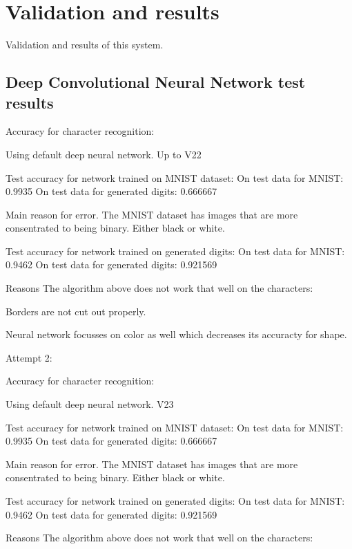 \chapter{Validation and results}
\label{ap:results}
\graphicspath{{Appendix5/Appendix5figures/}}

Validation and results of this system.

\section{Deep Convolutional Neural Network test results}
\label{sec:DCNNresult}

Accuracy for character recognition:

Using default deep neural network. Up to V22

Test accuracy for network trained on MNIST dataset:
On test data for MNIST: 		0.9935
On test data for generated digits: 	0.666667

Main reason for error.
The MNIST dataset has images that are more consentrated to being binary.
Either black or white.

Test accuracy for network trained on generated digits:
On test data for MNIST:			 0.9462
On test data for generated digits:	 0.921569


Reasons The algorithm above does not work that well on the characters:


Borders are not cut out properly.

Neural network focusses on color as well which decreases its accuracty for shape.

Attempt 2:

Accuracy for character recognition:

Using default deep neural network. V23

Test accuracy for network trained on MNIST dataset:
On test data for MNIST: 		0.9935
On test data for generated digits: 	0.666667

Main reason for error.
The MNIST dataset has images that are more consentrated to being binary.
Either black or white.

Test accuracy for network trained on generated digits:
On test data for MNIST:			 0.9462
On test data for generated digits:	 0.921569


Reasons The algorithm above does not work that well on the characters: